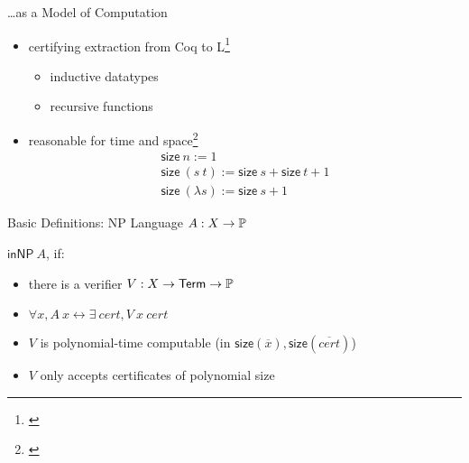 \documentclass[11pt,usenames,dvipsnames,
  hyperref={pdfencoding=auto,psdextra}]{beamer}
\begin{document}
\begin{frame}[noframenumbering]{\ldots as a Model of Computation}

  \begin{itemize}
    \item certifying extraction from Coq to L\footnote{\cite{ForsterKunze:2019:Certifying-extraction}}
      \begin{itemize}
        \item inductive datatypes
        \item recursive functions
      \end{itemize}
    \item<2-> reasonable for time and space\footnote{\cite{ForsterKunzeRoth:2019:wcbv-Reasonable}}
      \begin{gather*}
        \textsf{size}~n := 1 \\
        \textsf{size}~(s~t) := \textsf{size}~s + \textsf{size}~t + 1 \\ 
        \textsf{size}~(\lambda s) := \textsf{size}~s + 1
      \end{gather*}
  \end{itemize}

\end{frame}

\begin{frame}{Basic Definitions: NP}
  Language $A : X \rightarrow \mathbb{P}$

  \vspace{2ex}
  $\textsf{inNP}~A$, if:
  \begin{itemize}
    \item there is a verifier $V : X \rightarrow \textsf{Term} \rightarrow \mathbb{P}$
    \item $\forall x, A~x \leftrightarrow \exists~\mathit{cert}, V~x~\mathit{cert}$
    \item $V$ is polynomial-time computable (in $\textsf{size}(\overline x), \textsf{size}(\overline{cert})$)
    \item $V$ only accepts certificates of polynomial size
  \end{itemize}
\end{frame}
\end{document}
